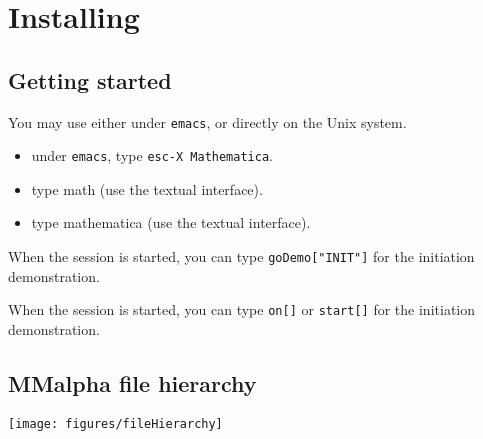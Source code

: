 \chapter{Installing \mmalfa{}}
\label{appendixtechset}
\label{install}

\newcommand{\mmalpha}{{MMalpha}}



\section{Getting started}
You may use either {\mma} under {\tt emacs}, or directly on the Unix 
system. 
\begin{itemize}
\item under {\tt emacs}, type {\tt  esc-X Mathematica}. 
\item type math (use the {\mma} textual interface).
\item type mathematica (use the {\mma} textual interface).
\end{itemize}
When the {\mma} session is started, you can type {\tt goDemo["INIT"]}
for the initiation demonstration.

When the {\mma} session is started, you can type {\tt on[]} or
\texttt{start[]} for the initiation demonstration.

\section{{\mmalpha} file hierarchy}
\texttt{[image: figures/fileHierarchy]}
